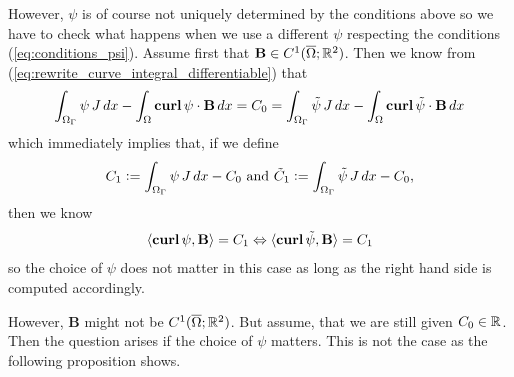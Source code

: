\documentclass[../master_thesis.tex]{subfiles}
\begin{document}
However, $\psi$ is of course not uniquely determined by the conditions above 
so we have to check what happens when we use a different $\psi$ respecting the 
conditions (\ref{eq:conditions_psi}).
Assume first that $\mathbf{B} \in C^1(\overline{\Omega};\real^2)$. Then we know from 
(\ref{eq:rewrite_curve_integral_differentiable}) that 
\begin{align*}
    \int_{\Omega_\Gamma} \psi \, J \, dx - 
    \int_\Omega \veccurl\psi \cdot \mathbf{B} \, dx 
    = C_0 = \int_{\Omega_\Gamma} \tilde{\psi} \, J \, dx - 
    \int_\Omega \veccurl \tilde{\psi} \cdot \mathbf{B} \, dx
\end{align*}
which immediately implies that, if we define 
\begin{align*}
    C_1 \vcentcolon= \int_{\Omega_\Gamma} \psi \, J \, dx - C_0 \text{ and }
    \tilde{C}_1 \vcentcolon= \int_{\Omega_\Gamma} \tilde{\psi} \, J \, dx - C_0,
\end{align*}
then we know 
\begin{align}
    \langle \veccurl \psi, \mathbf{B} \rangle = C_1 
    \Leftrightarrow \langle \veccurl \tilde{\psi}, \mathbf{B} \rangle = C_1
    \label{eq:equivalence_for_different_psis}
\end{align}
so the choice of $\psi$ does not matter in this case as long as the right hand 
side is computed accordingly.

However, $\mathbf{B}$ might not be $C^1(\overline{\Omega};\real^2)$. 
But assume, that we are still given $C_0 \in \real$. Then the question arises
if the choice of $\psi$ matters. This is not the case as the following proposition shows.
\end{document}
